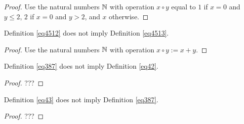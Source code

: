 \begin{proof}\leanok Use the natural numbers $\mathbb{N}$ with operation $x \circ y$ equal to $1$ if $x=0$ and $y \leq 2$, $2$ if $x=0$ and $y>2$, and $x$ otherwise.
\end{proof}

\begin{theorem}\label{4512_not_imply_4513}\leanok{} Definition \ref{eq4512} does not imply Definition \ref{eq4513}.
\end{theorem}

\begin{proof}\leanok Use the natural numbers $\mathbb{N}$ with operation $x \circ y := x + y$.
\end{proof}

\begin{theorem}\label{387_not_imply_42}\leanok{} Definition \ref{eq387} does not imply Definition \ref{eq42}.
\end{theorem}

\begin{proof} ???
\end{proof}

\begin{theorem}\label{43_not_imply_387}\leanok{} Definition \ref{eq43} does not imply Definition \ref{eq387}.
\end{theorem}

\begin{proof} ???
\end{proof}
